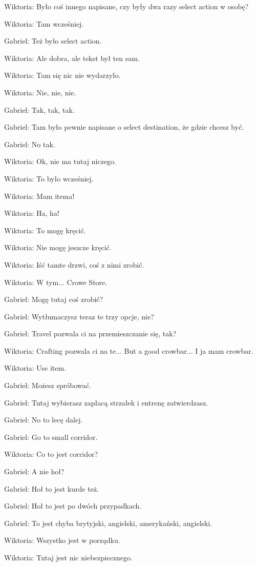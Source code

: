 Wiktoria: Było coś innego napisane, czy były dwa razy select action w osobę?

Wiktoria: Tam wcześniej.

Gabriel: Też było select action.

Wiktoria: Ale dobra, ale tekst był ten sam.

Wiktoria: Tam się nic nie wydarzyło.

Wiktoria: Nie, nie, nie.

Gabriel: Tak, tak, tak.

Gabriel: Tam było pewnie napisane o select destination, że gdzie chcesz być.

Gabriel: No tak.

Wiktoria: Ok, nie ma tutaj niczego.

Wiktoria: To było wcześniej.

Wiktoria: Mam itema!

Wiktoria: Ha, ha!

Wiktoria: To mogę kręcić.

Wiktoria: Nie mogę jeszcze kręcić.

Wiktoria: Iść tamte drzwi, coś z nimi zrobić.

Wiktoria: W tym... Crowe Store.

Gabriel: Mogę tutaj coś zrobić?

Gabriel: Wytłumaczysz teraz te trzy opcje, nie?

Gabriel: Travel pozwala ci na przemieszczanie się, tak?

Wiktoria: Crafting pozwala ci na te... But a good crowbar... I ja mam crowbar.

Wiktoria: Use item.

Gabriel: Możesz spróbować.

Gabriel: Tutaj wybierasz zapłacą strzałek i entrenę zatwierdzasz.

Gabriel: No to lecę dalej.

Gabriel: Go to small corridor.

Wiktoria: Co to jest corridor?

Gabriel: A nie hoł?

Gabriel: Hoł to jest kurde też.

Gabriel: Hoł to jest po dwóch przypadkach.

Gabriel: To jest chyba brytyjski, angielski, amerykański, angielski.

Wiktoria: Wszystko jest w porządku.

Wiktoria: Tutaj jest nic niebezpiecznego.

